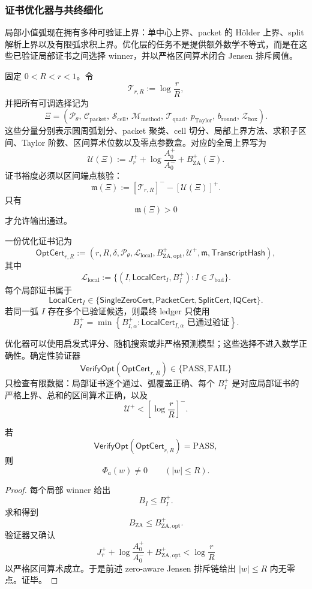 \subsubsection{证书优化器与共终细化}\label{subsubsec:typed-address-biaxial-completion-certificate-optimizer-cofinal-refinement}
局部小值弧现在拥有多种可验证上界：单中心上界、packet 的 Hölder 上界、split 解析上界以及有限弧求积上界。优化层的任务不是提供额外数学不等式，而是在这些已验证局部证书之间选择 winner，并以严格区间算术闭合 Jensen 排斥阈值。

固定 \(0<R<r<1\)。令
\[
\mathcal T_{r,R}:=\log\frac rR,
\]
并把所有可调选择记为
\[
\Xi=
\left(
\mathcal P_\theta,\,
\mathcal C_{\mathrm{packet}},\,
\mathcal S_{\mathrm{cell}},\,
\mathcal M_{\mathrm{method}},\,
\mathcal T_{\mathrm{quad}},\,
p_{\mathrm{Taylor}},\,
b_{\mathrm{round}},\,
\mathcal Z_{\mathrm{box}}
\right).
\]
这些分量分别表示圆周弧划分、packet 聚类、cell 切分、局部上界方法、求积子区间、Taylor 阶数、区间算术位数以及零点参数盒。对应的全局上界写为
\[
\mathcal U(\Xi)
:=
J_r^+
+
\log\frac{A_0^+}{A_0^-}
+
B_{\mathrm{ZA}}^+(\Xi).
\]
证书裕度必须以区间端点核验：
\[
\mathfrak m(\Xi)
:=
\left[\mathcal T_{r,R}\right]^-
-
\left[\mathcal U(\Xi)\right]^+.
\]
只有
\[
\mathfrak m(\Xi)>0
\]
才允许输出通过。

\begin{definition}[优化证书]\label{def:typed-address-biaxial-completion-optimization-certificate}
一份优化证书记为
\[
\mathsf{OptCert}_{r,R}
:=
\left(
r,R,\delta,
\mathcal P_\theta,
\mathcal L_{\mathrm{local}},
B_{\mathrm{ZA,opt}}^+,
\mathcal U^+,
\mathfrak m,
\mathsf{TranscriptHash}
\right),
\]
其中
\[
\mathcal L_{\mathrm{local}}
:=
\{(I,\mathsf{LocalCert}_I,B_I^+):I\in\mathcal I_{\mathrm{bad}}\}.
\]
每个局部证书属于
\[
\mathsf{LocalCert}_I
\in
\{
\mathsf{SingleZeroCert},
\mathsf{PacketCert},
\mathsf{SplitCert},
\mathsf{IQCert}
\}.
\]
若同一弧 \(I\) 存在多个已验证候选，则最终 ledger 只使用
\[
B_I^+
=
\min
\left\{
B_{I,\alpha}^+:
\mathsf{LocalCert}_{I,\alpha}\text{ 已通过验证}
\right\}.
\]
\end{definition}

优化器可以使用启发式评分、随机搜索或非严格预测模型；这些选择不进入数学正确性。确定性验证器
\[
\mathsf{VerifyOpt}(\mathsf{OptCert}_{r,R})
\in
\{\mathrm{PASS},\mathrm{FAIL}\}
\]
只检查有限数据：局部证书逐个通过、弧覆盖正确、每个 \(B_I^+\) 是对应局部证书的严格上界、总和的区间算术正确，以及
\[
\mathcal U^+<\left[\log\frac rR\right]^-.
\]

\begin{theorem}[优化证书的零点排斥语义]\label{thm:typed-address-biaxial-completion-optimized-jensen-rejection-certificate}
若
\[
\mathsf{VerifyOpt}(\mathsf{OptCert}_{r,R})=\mathrm{PASS},
\]
则
\[
\Phi_a(w)\ne0
\qquad(|w|\le R).
\]
\end{theorem}
\begin{proof}
每个局部 winner 给出
\[
B_I\le B_I^+.
\]
求和得到
\[
B_{\mathrm{ZA}}\le B_{\mathrm{ZA,opt}}^+.
\]
验证器又确认
\[
J_r^+
+
\log\frac{A_0^+}{A_0^-}
+
B_{\mathrm{ZA,opt}}^+
<
\log\frac rR
\]
以严格区间算术成立。于是前述 zero-aware Jensen 排斥链给出 \(|w|\le R\) 内无零点。证毕。
\end{proof}

